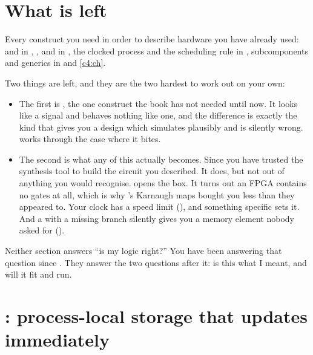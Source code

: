 
\section{What is left}
\label{c5:sec:intro}

Every construct you need in order to describe hardware you have already used:  and
 in , ,  and  in
, the clocked process and the scheduling rule in , subcomponents and
generics in  and \ref{c4:ch}.

Two things are left, and they are the two hardest to work out on your own:
\begin{itemize}
  \item The first is , the one construct the book has not needed until now. It looks
    like a signal and behaves nothing like one, and the difference is exactly the kind that gives
    you a design which simulates plausibly and is silently wrong.  works
    through the case where it bites.
  \item The second is what any of this actually becomes. Since  you have trusted the
    synthesis tool to build the circuit you described. It does, but not out of anything you would
    recognise.  opens the box. It turns out an FPGA contains no gates at all,
    which is why 's Karnaugh maps bought you less than they appeared to. Your clock
    has a speed limit (), and something specific sets it. And a  with
    a missing branch silently gives you a memory element nobody asked for
    ().
\end{itemize}

Neither section answers ``is my logic right?'' You have been answering that question since
. They answer the two questions after it: is this what I meant, and will it fit and
run.

\section{: process-local storage that updates immediately}
\label{c5:sec:variable}

